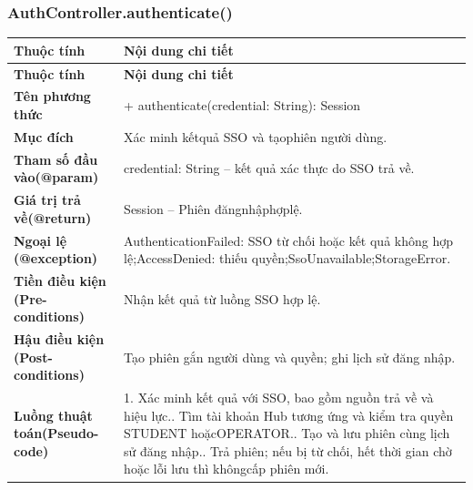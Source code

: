 \subsubsection{AuthController.authenticate()}
\begin{longtable}{|L{0.24\textwidth}|L{0.70\textwidth}|}
\hline
\textbf{Thuộc tính} & \textbf{Nội dung chi tiết} \\
\hline
\endfirsthead
\hline
\textbf{Thuộc tính} & \textbf{Nội dung chi tiết} \\
\hline
\endhead
\textbf{Tên phương thức} & + authenticate(credential: String): Session \\
\hline
\textbf{Mục đích} & Xác minh kếtquả SSO và tạophiên người dùng. \\
\hline
\textbf{Tham số đầu vào}\newline \textbf{(@param)} & credential: String – kết quả xác thực do SSO trả về. \\
\hline
\textbf{Giá trị trả về(@return)} & Session – Phiên đăngnhậphợplệ. \\
\hline
\textbf{Ngoại lệ (@exception)} & AuthenticationFailed: SSO từ chối hoặc kết quả không hợp lệ;\newline AccessDenied: thiếu quyền;\newline SsoUnavailable;\newline StorageError. \\
\hline
\textbf{Tiền điều kiện (Pre-}\newline \textbf{conditions)} & Nhận kết quả từ luồng SSO hợp lệ. \\
\hline
\textbf{Hậu điều kiện (Post-}\newline \textbf{conditions)} & Tạo phiên gắn người dùng và quyền; ghi lịch sử đăng nhập. \\
\hline
\textbf{Luồng thuật toán}\newline \textbf{(Pseudo-code)} & 1. Xác minh kết quả với SSO, bao gồm nguồn trả về và hiệu lực.. Tìm tài khoản Hub tương ứng và kiểm tra quyền STUDENT hoặc\newline OPERATOR.. Tạo và lưu phiên cùng lịch sử đăng nhập.. Trả phiên; nếu bị từ chối, hết thời gian chờ hoặc lỗi lưu thì không\newline cấp phiên mới. \\
\hline
\end{longtable}
\vspace{-0.5\baselineskip}
